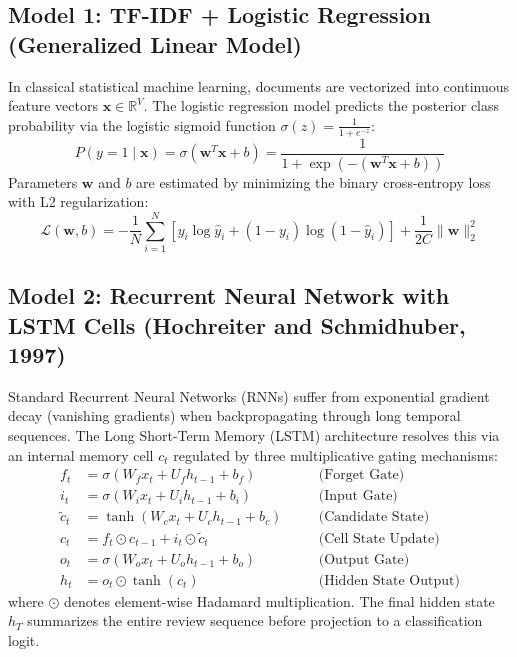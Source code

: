\subsection{Model 1: TF-IDF + Logistic Regression (Generalized Linear Model)}
In classical statistical machine learning, documents are vectorized into continuous feature vectors $\mathbf{x} \in \mathbb{R}^{V}$. The logistic regression model predicts the posterior class probability via the logistic sigmoid function $\sigma(z) = \frac{1}{1 + e^{-z}}$:
\begin{equation}
    P(y = 1 \mid \mathbf{x}) = \sigma(\mathbf{w}^T \mathbf{x} + b) = \frac{1}{1 + \exp(-(\mathbf{w}^T \mathbf{x} + b))}
\end{equation}
Parameters $\mathbf{w}$ and $b$ are estimated by minimizing the binary cross-entropy loss with L2 regularization:
\begin{equation}
    \mathcal{L}(\mathbf{w}, b) = -\frac{1}{N} \sum_{i=1}^{N} \left[ y_i \log \hat{y}_i + (1 - y_i) \log(1 - \hat{y}_i) \right] + \frac{1}{2C} \|\mathbf{w}\|_2^2
\end{equation}

\subsection{Model 2: Recurrent Neural Network with LSTM Cells (Hochreiter and Schmidhuber, 1997)}
Standard Recurrent Neural Networks (RNNs) suffer from exponential gradient decay (vanishing gradients) when backpropagating through long temporal sequences. The Long Short-Term Memory (LSTM) architecture resolves this via an internal memory cell $c_t$ regulated by three multiplicative gating mechanisms:
\begin{align}
    f_t &= \sigma(W_f x_t + U_f h_{t-1} + b_f) \quad &&\text{(Forget Gate)} \\
    i_t &= \sigma(W_i x_t + U_i h_{t-1} + b_i) \quad &&\text{(Input Gate)} \\
    \tilde{c}_t &= \tanh(W_c x_t + U_c h_{t-1} + b_c) \quad &&\text{(Candidate State)} \\
    c_t &= f_t \odot c_{t-1} + i_t \odot \tilde{c}_t \quad &&\text{(Cell State Update)} \\
    o_t &= \sigma(W_o x_t + U_o h_{t-1} + b_o) \quad &&\text{(Output Gate)} \\
    h_t &= o_t \odot \tanh(c_t) \quad &&\text{(Hidden State Output)}
\end{align}
where $\odot$ denotes element-wise Hadamard multiplication. The final hidden state $h_T$ summarizes the entire review sequence before projection to a classification logit.

